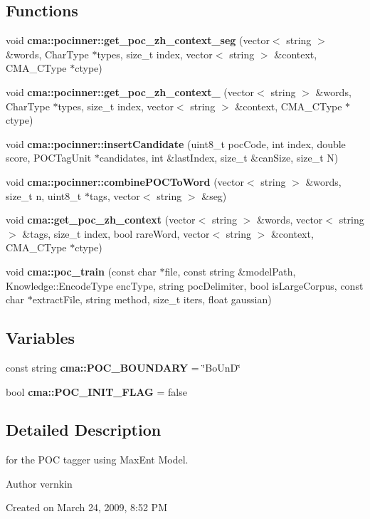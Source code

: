 \subsection*{Functions}
\begin{DoxyCompactItemize}
\item 
void {\bf cma::pocinner::get\_\-poc\_\-zh\_\-context\_\-seg} (vector$<$ string $>$ \&words, CharType $\ast$types, size\_\-t index, vector$<$ string $>$ \&context, CMA\_\-CType $\ast$ctype)
\item 
void {\bf cma::pocinner::get\_\-poc\_\-zh\_\-context\_} (vector$<$ string $>$ \&words, CharType $\ast$types, size\_\-t index, vector$<$ string $>$ \&context, CMA\_\-CType $\ast$ctype)
\item 
void {\bf cma::pocinner::insertCandidate} (uint8\_\-t pocCode, int index, double score, POCTagUnit $\ast$candidates, int \&lastIndex, size\_\-t \&canSize, size\_\-t N)
\item 
void {\bf cma::pocinner::combinePOCToWord} (vector$<$ string $>$ \&words, size\_\-t n, uint8\_\-t $\ast$tags, vector$<$ string $>$ \&seg)
\item 
void {\bf cma::get\_\-poc\_\-zh\_\-context} (vector$<$ string $>$ \&words, vector$<$ string $>$ \&tags, size\_\-t index, bool rareWord, vector$<$ string $>$ \&context, CMA\_\-CType $\ast$ctype)
\item 
void {\bf cma::poc\_\-train} (const char $\ast$file, const string \&modelPath, Knowledge::EncodeType encType, string pocDelimiter, bool isLargeCorpus, const char $\ast$extractFile, string method, size\_\-t iters, float gaussian)
\end{DoxyCompactItemize}
\subsection*{Variables}
\begin{DoxyCompactItemize}
\item 
const string {\bfseries cma::POC\_\-BOUNDARY} = \char`\"{}BoUnD\char`\"{}\label{namespacecma_a6a315ae82b1eb14e31c1c281af3b041c}

\item 
bool {\bfseries cma::POC\_\-INIT\_\-FLAG} = false\label{namespacecma_a835f0d6dd48a8037cf3d4a5a415a7323}

\end{DoxyCompactItemize}


\subsection{Detailed Description}
for the POC tagger using MaxEnt Model. \begin{DoxyAuthor}{Author}
vernkin
\end{DoxyAuthor}
Created on March 24, 2009, 8:52 PM 

